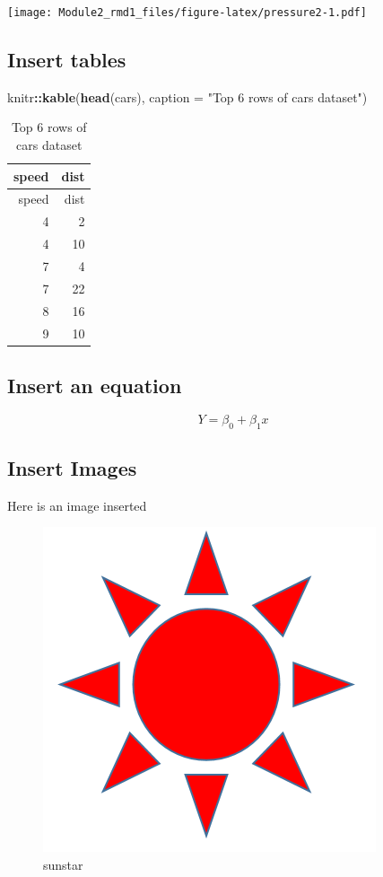 \documentclass[
]{article}
\newenvironment{Shaded}{\begin{snugshade}}{\end{snugshade}}
\newcommand{\DataTypeTok}[1]{\textcolor[rgb]{0.13,0.29,0.53}{#1}}
\newcommand{\KeywordTok}[1]{\textcolor[rgb]{0.13,0.29,0.53}{\textbf{#1}}}
\newcommand{\NormalTok}[1]{#1}
\newcommand{\OperatorTok}[1]{\textcolor[rgb]{0.81,0.36,0.00}{\textbf{#1}}}
\newcommand{\StringTok}[1]{\textcolor[rgb]{0.31,0.60,0.02}{#1}}
\begin{document}
\texttt{[image: Module2\_rmd1\_files/figure-latex/pressure2-1.pdf]}

\hypertarget{insert-tables}{%
\subsection{Insert tables}\label{insert-tables}}

\begin{Shaded}
\begin{Highlighting}[]
\NormalTok{knitr}\OperatorTok{::}\KeywordTok{kable}\NormalTok{(}\KeywordTok{head}\NormalTok{(cars),}
             \DataTypeTok{caption =} \StringTok{"Top 6 rows of cars dataset"}\NormalTok{)}
\end{Highlighting}
\end{Shaded}

\begin{longtable}[]{@{}rr@{}}
\caption{Top 6 rows of cars dataset}\tabularnewline
\toprule
speed & dist\tabularnewline
\midrule
\endfirsthead
\toprule
speed & dist\tabularnewline
\midrule
\endhead
4 & 2\tabularnewline
4 & 10\tabularnewline
7 & 4\tabularnewline
7 & 22\tabularnewline
8 & 16\tabularnewline
9 & 10\tabularnewline
\bottomrule
\end{longtable}

\hypertarget{insert-an-equation}{%
\subsection{Insert an equation}\label{insert-an-equation}}

\[ Y = \beta_0 + \beta_1x \]

\hypertarget{insert-images}{%
\subsection{Insert Images}\label{insert-images}}

Here is an image inserted

\begin{figure}
\centering
\includegraphics{sunstar.png}
\caption{sunstar}
\end{figure}
\end{document}
